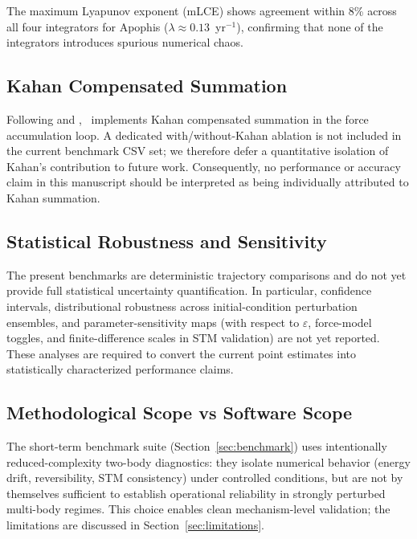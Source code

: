 The maximum Lyapunov exponent (mLCE) shows agreement
within 8\% across all four integrators for Apophis
($\lambda \approx 0.13$~yr$^{-1}$), confirming that
none of the integrators introduces spurious numerical chaos.

\subsection{Kahan Compensated Summation}
\label{sec:kahan}

Following \citet{Kahan1965} and \citet{Zeebe2023}, \AAS\ implements
Kahan compensated summation in the force accumulation loop.
A dedicated with/without-Kahan ablation is not included in the
current benchmark CSV set; we therefore defer a quantitative
isolation of Kahan's contribution to future work.
Consequently, no performance or accuracy claim in this manuscript
should be interpreted as being individually attributed to Kahan
summation.

\subsection{Statistical Robustness and Sensitivity}
\label{sec:stats_sensitivity}

The present benchmarks are deterministic trajectory comparisons and
do not yet provide full statistical uncertainty quantification.
In particular, confidence intervals, distributional robustness across
initial-condition perturbation ensembles, and parameter-sensitivity
maps (with respect to $\varepsilon$, force-model toggles, and
finite-difference scales in STM validation) are not yet reported.
These analyses are required to convert the current point estimates
into statistically characterized performance claims.

\subsection{Methodological Scope vs Software Scope}
\label{sec:method_scope}

The short-term benchmark suite (Section~\ref{sec:benchmark}) uses
intentionally reduced-complexity two-body diagnostics: they isolate
numerical behavior (energy drift, reversibility, STM consistency)
under controlled conditions, but are not by themselves sufficient
to establish operational reliability in strongly perturbed
multi-body regimes. This choice enables clean mechanism-level
validation; the limitations are discussed in
Section~\ref{sec:limitations}.

